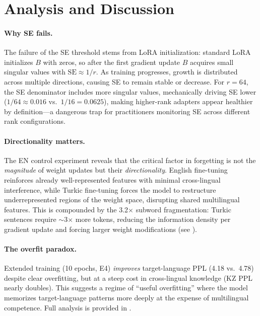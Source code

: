 \documentclass[11pt]{article}
\begin{document}
\section{Analysis and Discussion}

\paragraph{Why SE fails.} The failure of the SE threshold stems from LoRA initialization: standard LoRA initializes $B$ with zeros, so after the first gradient update $B$ acquires small singular values with $\text{SE} \approx 1/r$. As training progresses, growth is distributed across multiple directions, causing SE to remain stable or decrease. For $r{=}64$, the SE denominator includes more singular values, mechanically driving SE lower ($1/64 \approx 0.016$ vs.\ $1/16 = 0.0625$), making higher-rank adapters appear healthier by definition---a dangerous trap for practitioners monitoring SE across different rank configurations.

\paragraph{Directionality matters.} The EN control experiment reveals that the critical factor in forgetting is not the \emph{magnitude} of weight updates but their \emph{directionality}. English fine-tuning reinforces already well-represented features with minimal cross-lingual interference, while Turkic fine-tuning forces the model to restructure underrepresented regions of the weight space, disrupting shared multilingual features. This is compounded by the 3.2$\times$ subword fragmentation: Turkic sentences require $\sim$3$\times$ more tokens, reducing the information density per gradient update and forcing larger weight modifications (see ).

\paragraph{The overfit paradox.} Extended training (10 epochs, E4) \emph{improves} target-language PPL (4.18 vs.\ 4.78) despite clear overfitting, but at a steep cost in cross-lingual knowledge (KZ PPL nearly doubles). This suggests a regime of ``useful overfitting'' where the model memorizes target-language patterns more deeply at the expense of multilingual competence. Full analysis is provided in .
\end{document}
